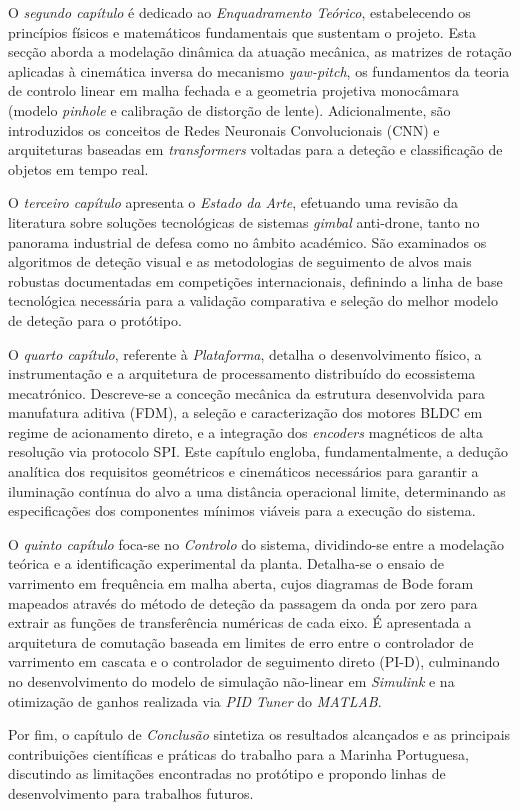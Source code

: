 \begin{introduction}
O \emph{segundo capítulo} é dedicado ao \emph{Enquadramento Teórico}, estabelecendo os princípios físicos e matemáticos fundamentais que sustentam o projeto. Esta secção aborda a modelação dinâmica da atuação mecânica, as matrizes de rotação aplicadas à cinemática inversa do mecanismo \emph{yaw-pitch}, os fundamentos da teoria de controlo linear em malha fechada e a geometria projetiva monocâmara (modelo \emph{pinhole} e calibração de distorção de lente). Adicionalmente, são introduzidos os conceitos de Redes Neuronais Convolucionais (CNN) e arquiteturas baseadas em \emph{transformers} voltadas para a deteção e classificação de objetos em tempo real.

O \emph{terceiro capítulo} apresenta o \emph{Estado da Arte}, efetuando uma revisão da literatura sobre soluções tecnológicas de sistemas \emph{gimbal} anti-drone, tanto no panorama industrial de defesa como no âmbito académico. São examinados os algoritmos de deteção visual e as metodologias de seguimento de alvos mais robustas documentadas em competições internacionais, definindo a linha de base tecnológica necessária para a validação comparativa e seleção do melhor modelo de deteção para o protótipo.

O \emph{quarto capítulo}, referente à \emph{Plataforma}, detalha o desenvolvimento físico, a instrumentação e a arquitetura de processamento distribuído do ecossistema mecatrónico. Descreve-se a conceção mecânica da estrutura desenvolvida para manufatura aditiva (FDM), a seleção e caracterização dos motores BLDC em regime de acionamento direto, e a integração dos \emph{encoders} magnéticos de alta resolução via protocolo SPI. Este capítulo engloba, fundamentalmente, a dedução analítica dos requisitos geométricos e cinemáticos necessários para garantir a iluminação contínua do alvo a uma distância operacional limite, determinando as especificações dos componentes mínimos viáveis para a execução do sistema.

O \emph{quinto capítulo} foca-se no \emph{Controlo} do sistema, dividindo-se entre a modelação teórica e a identificação experimental da planta. Detalha-se o ensaio de varrimento em frequência em malha aberta, cujos diagramas de Bode foram mapeados através do método de deteção da passagem da onda por zero para extrair as funções de transferência numéricas de cada eixo. É apresentada a arquitetura de comutação baseada em limites de erro entre o controlador de varrimento em cascata e o controlador de seguimento direto (PI-D), culminando no desenvolvimento do modelo de simulação não-linear em \emph{Simulink} e na otimização de ganhos realizada via \emph{PID Tuner} do \emph{MATLAB}.

Por fim, o capítulo de \emph{Conclusão} sintetiza os resultados alcançados e as principais contribuições científicas e práticas do trabalho para a Marinha Portuguesa, discutindo as limitações encontradas no protótipo e propondo linhas de desenvolvimento para trabalhos futuros.

\end{introduction}
